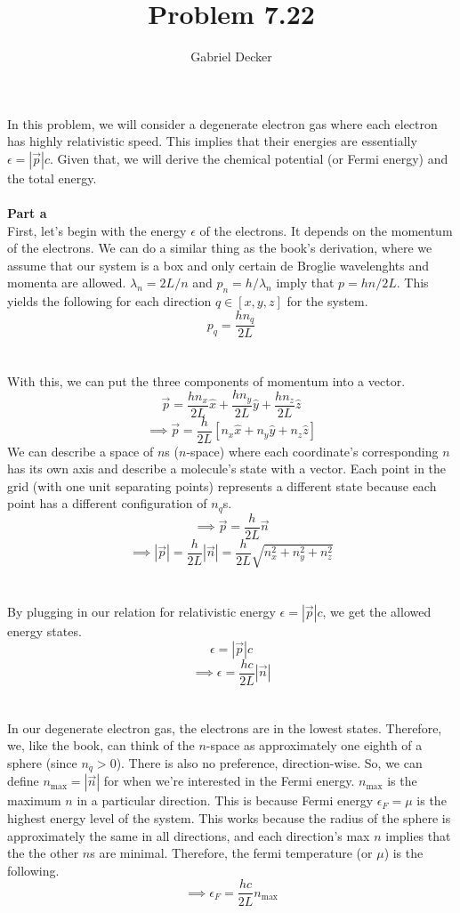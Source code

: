 \documentclass[12pt]{article}
\title{Problem 7.22}
\author{Gabriel Decker}
\begin{document}
\maketitle
\begin{flushleft}


In this problem, we will consider a degenerate electron gas where each electron has highly relativistic speed.
This implies that their energies are essentially $\epsilon=|\vec{p}|c$.
Given that, we will derive the chemical potential (or Fermi energy) and the total energy.\\~\\

\textbf{Part a}\\

First, let's begin with the energy $\epsilon$ of the electrons.
It depends on the momentum of the electrons.
We can do a similar thing as the book's derivation, where we assume that our system is a box and only certain de Broglie wavelenghts and momenta are allowed.
$\lambda_n=2L/n$ and $p_n=h/\lambda_n$ imply that $p=hn/2L$.
This yields the following for each direction $q\in[x,y,z]$ for the system.
$$p_q=\frac{hn_q}{2L}$$\\~\\

With this, we can put the three components of momentum into a vector.
$$\vec{p}=\frac{hn_x}{2L}\hat{x}+\frac{hn_y}{2L}\hat{y}+\frac{hn_z}{2L}\hat{z}$$
$$\implies\vec{p}=\frac{h}{2L}\left[n_x\hat{x}+n_y\hat{y}+n_z\hat{z}\right]$$
We can describe a space of $n$s ($n$-space) where each coordinate's corresponding $n$ has its own axis and describe a molecule's state with a vector.
Each point in the grid (with one unit separating points) represents a different state because each point has a different configuration of $n_q$s.
$$\implies\vec{p}=\frac{h}{2L}\vec{n}$$
$$\implies|\vec{p}|=\frac{h}{2L}|\vec{n}|=\frac{h}{2L}\sqrt{n_x^2+n_y^2+n_z^2}$$\\~\\

By plugging in our relation for relativistic energy $\epsilon=|\vec{p}|c$, we get the allowed energy states.
$$\epsilon=|\vec{p}|c$$
$$\implies\epsilon=\frac{hc}{2L}|\vec{n}|$$\\~\\

In our degenerate electron gas, the electrons are in the lowest states.
Therefore, we, like the book, can think of the $n$-space as approximately one eighth of a sphere (since $n_q>0$).
There is also no preference, direction-wise.
So, we can define $n_\text{max}=|\vec{n}|$ for when we're interested in the Fermi energy.
$n_\text{max}$ is the maximum $n$ in a particular direction.
This is because Fermi energy $\epsilon_F=\mu$ is the highest energy level of the system.
This works because the radius of the sphere is approximately the same in all directions, and each direction's max $n$ implies that the the other $n$s are minimal.
Therefore, the fermi temperature (or $\mu$) is the following.
$$\implies\epsilon_F=\frac{hc}{2L}n_\text{max}$$\\~\\


\end{flushleft}
\end{document}
